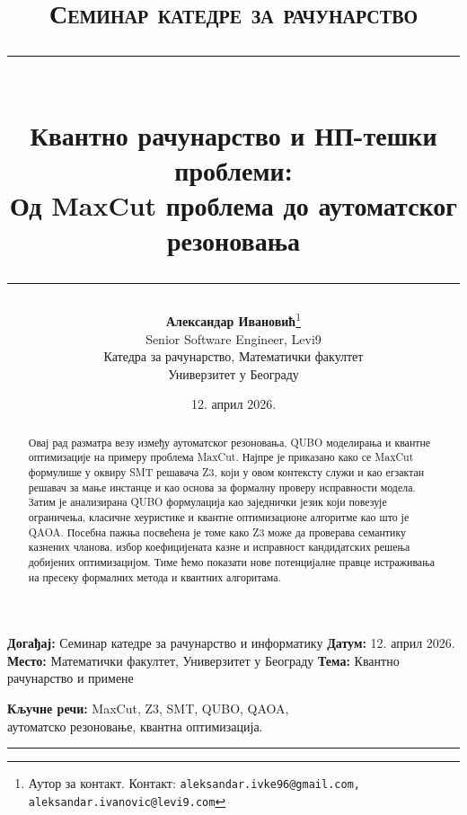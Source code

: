 \documentclass[12pt, a4paper]{article}
\title{%
  {\large\scshape Семинар катедре за рачунарство}\\[8pt]
  \rule{\linewidth}{1.2pt}\\[10pt]
  {\LARGE\bfseries Квантно рачунарство и НП-тешки проблеми:\\[4pt]
   \Large Од MaxCut проблема до аутоматског резоновања}\\[6pt]
  \rule{\linewidth}{0.5pt}
}
\author{%
  \textbf{Александар Ивановић}\thanks{Аутор за контакт.
    Контакт: \texttt{aleksandar.ivke96@gmail.com,\\ aleksandar.ivanovic@levi9.com}}\\{\small Senior Software Engineer, Levi9}\\
  \small Катедра за рачунарство, Математички факултет\\
  \small Универзитет у Београду\\[6pt]
}
\date{12. април 2026.}
\theoremstyle{remark}
\newcommand{\conferencebanner}{%
  \begin{tcolorbox}[infostyle, title=Информације]
    \small
    \textbf{Догађај:} Семинар катедре за рачунарство и информатику
    \textbf{Датум:} 12. април 2026. \quad
    \textbf{Место:} Математички факултет, Универзитет у Београду
    \textbf{Тема:} Квантно рачунарство и примене
  \end{tcolorbox}
  \vspace{0.6cm}
}
\begin{document}

\maketitle
\thispagestyle{fancy}
\vspace{0.4cm}
\conferencebanner

\begin{abstract}
\noindent
Овај рад разматра везу између аутоматског резоновања, QUBO моделирања
и квантне оптимизације на примеру проблема MaxCut. Најпре је приказано
како се MaxCut формулише у оквиру SMT решавача Z3, који у овом контексту
служи и као егзактан решавач за мање инстанце и као основа за формалну
проверу исправности модела. Затим је анализирана QUBO формулација као
заједнички језик који повезује ограничења, класичне хеуристике и квантне
оптимизационе алгоритме као што је QAOA. Посебна пажња посвећена је томе
како Z3 може да проверава семантику казнених чланова, избор коефицијената
казне и исправност кандидатских решења добијених оптимизацијом. Тиме ћемо
показати нове потенцијалне правце истраживања на пресеку формалних метода и
квантних алгоритама.
\end{abstract}

\textbf{Кључне речи:} MaxCut, Z3, SMT, QUBO, QAOA,\\
аутоматско резоновање, квантна оптимизација.

\vspace{0.5em}
\hrule
\vspace{1.2em}

\tableofcontents
\newpage









\end{document}
